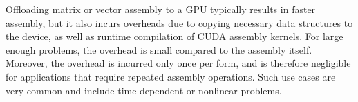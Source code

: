 
Offloading matrix or vector assembly to a GPU typically results in faster assembly, but it also incurs overheads due to copying necessary data structures to the device, as well as runtime compilation of CUDA assembly kernels. For large enough problems, the overhead is small compared to the assembly itself. Moreover, the overhead is incurred only once per form, and is therefore negligible for applications that require repeated assembly operations. Such use cases are very common and include time-dependent or nonlinear problems.

